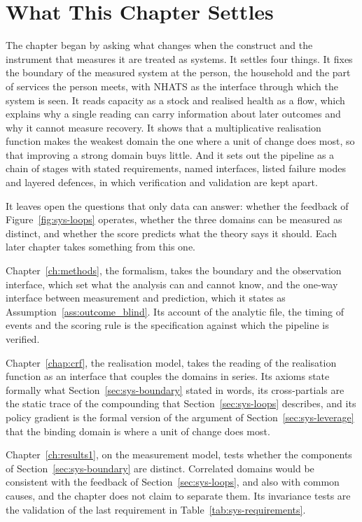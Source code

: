 \section{What This Chapter Settles}
\label{sec:sys-close}

The chapter began by asking what changes when the construct and the
instrument that measures it are treated as systems. It settles four things.
It fixes the boundary of the measured system at the person, the household and
the part of services the person meets, with NHATS as the interface through
which the system is seen. It reads capacity as a stock and realised health as
a flow, which explains why a single reading can carry information about later
outcomes and why it cannot measure recovery. It shows that a multiplicative
realisation function makes the weakest domain the one where a unit of change
does most, so that improving a strong domain buys little. And it sets out the
pipeline as a chain of stages with stated requirements, named interfaces,
listed failure modes and layered defences, in which verification and
validation are kept apart.

It leaves open the questions that only data can answer: whether the feedback
of Figure~\ref{fig:sys-loops} operates, whether the three domains can be
measured as distinct, and whether the score predicts what the theory says it
should. Each later chapter takes something from this one.

Chapter~\ref{ch:methods}, the formalism, takes the boundary and the
observation interface, which set what the analysis can and cannot know, and
the one-way interface between measurement and prediction, which it states as
Assumption~\ref{ass:outcome_blind}. Its account of the analytic file, the
timing of events and the scoring rule is the specification against which the
pipeline is verified.

Chapter~\ref{chap:crf}, the realisation model, takes the reading of the
realisation function as an interface that couples the domains in series. Its
axioms state formally what Section~\ref{sec:sys-boundary} stated in words,
its cross-partials are the static trace of the compounding that
Section~\ref{sec:sys-loops} describes, and its policy gradient is the formal
version of the argument of Section~\ref{sec:sys-leverage} that the binding
domain is where a unit of change does most.

Chapter~\ref{ch:results1}, on the measurement model, tests whether the
components of Section~\ref{sec:sys-boundary} are distinct. Correlated domains
would be consistent with the feedback of Section~\ref{sec:sys-loops}, and also
with common causes, and the chapter does not claim to separate them. Its
invariance tests are the validation of the last requirement in
Table~\ref{tab:sys-requirements}.

